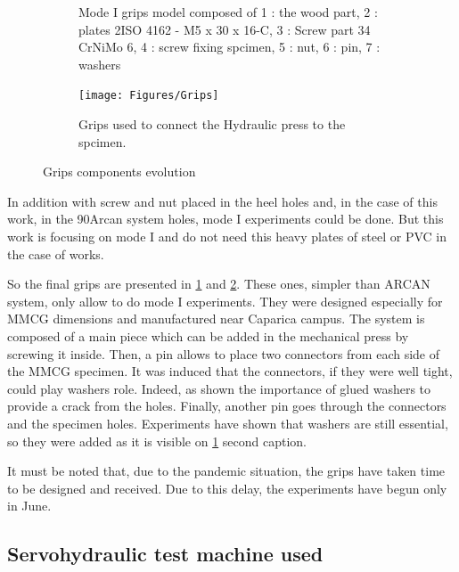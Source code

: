 \begin{figure}[h]
\begin{subfigure}{0.48\linewidth}
		\decoRule
		\caption[Grips modelled]{Mode I grips model composed of 1 : the wood part, 2 : plates 2ISO 4162 - M5 x 30 x 16-C, 3 : Screw part 34 CrNiMo 6, 4 : screw fixing spcimen, 5 : nut, 6 : pin, 7 : washers}
		\label{fig:Grips_model}
	\end{subfigure}
	\hfill
	\begin{subfigure}{0.48\linewidth}
		\texttt{[image: Figures/Grips]}
		\decoRule
		\caption[Grips]{Grips used to connect the Hydraulic press to the spcimen.}
		\label{Grips}
	\end{subfigure}
	\caption{Grips components evolution}
	\label{Grips components evolution}
\end{figure}

In addition with screw and nut placed in the heel holes and, in the case of this work, in the 90\textdegree Arcan system holes, mode I experiments could be done. But this work is focusing on mode I and do not need this heavy plates of steel or PVC in the case of \parencite{Reference8} works.

So the final grips are presented in \ref{fig:Grips_model} and \ref{Grips}. These ones, simpler than ARCAN system, only allow to do mode I experiments. They were designed especially for MMCG dimensions and manufactured near Caparica campus. The system is composed of a main piece which can be added in the mechanical press by screwing it inside. Then, a pin allows to place two connectors from each side of the MMCG specimen. It was induced that the connectors, if they were well tight, could play washers role. Indeed, \parencite{Reference7} as shown the importance of glued washers to provide a crack from the holes. Finally, another pin goes through the connectors and the specimen holes. Experiments have shown that washers are still essential, so they were added as it is visible on \ref{fig:Grips_model} second caption.

It must be noted that, due to the pandemic situation, the grips have taken time to be designed and received. Due to this delay, the experiments have begun only in June.


\subsection{Servohydraulic test machine used}


